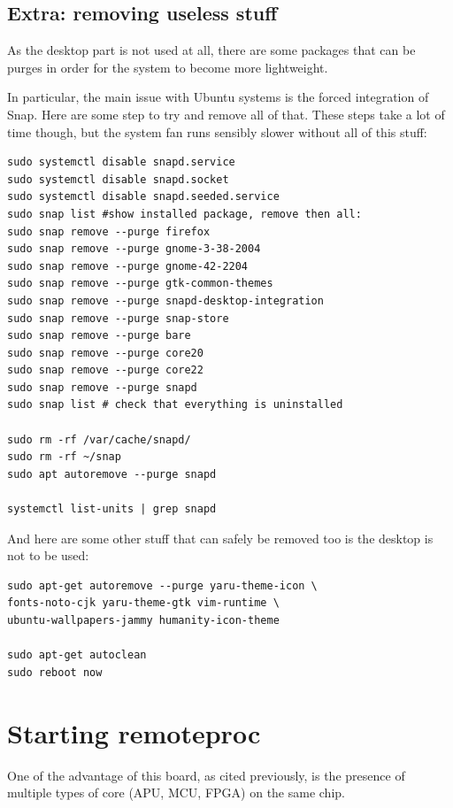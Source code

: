 \documentclass[10pt]{article}
\begin{document}
\subsection{Extra: removing useless stuff}
\label{sec:extr-remov-usel}
As the desktop part is not used at all, there are some packages
that can be purges in order for the system to become more lightweight.

In particular, the main issue with Ubuntu systems is the forced integration of Snap.
Here are some step to try and remove all of that. These steps
take a lot of time though, but the system fan runs sensibly slower
without all of this stuff:
\begin{tcolorbox}
\begin{verbatim}
sudo systemctl disable snapd.service
sudo systemctl disable snapd.socket
sudo systemctl disable snapd.seeded.service
sudo snap list #show installed package, remove then all:
sudo snap remove --purge firefox
sudo snap remove --purge gnome-3-38-2004
sudo snap remove --purge gnome-42-2204
sudo snap remove --purge gtk-common-themes
sudo snap remove --purge snapd-desktop-integration
sudo snap remove --purge snap-store
sudo snap remove --purge bare
sudo snap remove --purge core20
sudo snap remove --purge core22
sudo snap remove --purge snapd
sudo snap list # check that everything is uninstalled

sudo rm -rf /var/cache/snapd/
sudo rm -rf ~/snap
sudo apt autoremove --purge snapd

systemctl list-units | grep snapd
\end{verbatim}
\end{tcolorbox}

And here are some other stuff that can safely be removed too is the desktop is not to be used:
\begin{tcolorbox}
\begin{verbatim}
sudo apt-get autoremove --purge yaru-theme-icon \
fonts-noto-cjk yaru-theme-gtk vim-runtime \
ubuntu-wallpapers-jammy humanity-icon-theme

sudo apt-get autoclean
sudo reboot now
\end{verbatim}
\end{tcolorbox}

\pagebreak
\section{Starting remoteproc}
\label{sec:starting-remoteproc}
One of the advantage of this board, as cited previously, is the presence of
multiple types of core (APU, MCU, FPGA) on the same chip.
\end{document}
